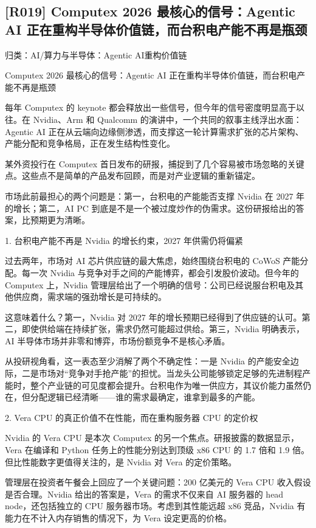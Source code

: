 \documentclass[11pt]{ctexart}
\begin{document}
\subsection{[R019] Computex 2026 最核心的信号：Agentic AI 正在重构半导体价值链，而台积电产能不再是瓶颈}
{\small\color{refgray}归类：AI/算力与半导体：Agentic AI重构价值链}

Computex 2026 最核心的信号：Agentic AI 正在重构半导体价值链，而台积电产能不再是瓶颈

每年 Computex 的 keynote 都会释放出一些信号，但今年的信号密度明显高于以往。在 Nvidia、Arm 和 Qualcomm 的演讲中，一个共同的叙事主线浮出水面：Agentic AI 正在从云端向边缘侧渗透，而支撑这一轮计算需求扩张的芯片架构、产能分配和竞争格局，正在发生结构性变化。

某外资投行在 Computex 首日发布的研报，捕捉到了几个容易被市场忽略的关键点。这些点不是简单的产品发布回顾，而是对产业逻辑的重新锚定。

市场此前最担心的两个问题是：第一，台积电的产能能否支撑 Nvidia 在 2027 年的增长；第二，AI PC 到底是不是一个被过度炒作的伪需求。这份研报给出的答案，比预期更为清晰。

1. 台积电产能不再是 Nvidia 的增长约束，2027 年供需仍将偏紧

过去两年，市场对 AI 芯片供应链的最大焦虑，始终围绕台积电的 CoWoS 产能分配。每一次 Nvidia 与竞争对手之间的产能博弈，都会引发股价波动。但今年的 Computex 上，Nvidia 管理层给出了一个明确的信号：公司已经说服台积电及其他供应商，需求端的强劲增长是可持续的。

这意味着什么？第一，Nvidia 对 2027 年的增长预期已经得到了供应链的认可。第二，即使供给端在持续扩张，需求仍然可能超过供给。第三，Nvidia 明确表示，AI 半导体市场并非零和博弈，市场份额竞争不是核心矛盾。

从投研视角看，这一表态至少消解了两个不确定性：一是 Nvidia 的产能安全边际，二是市场对“竞争对手抢产能”的担忧。当龙头公司能够锁定足够的先进制程产能时，整个产业链的可见度都会提升。台积电作为唯一供应方，其议价能力虽然仍在，但分配逻辑已经清晰——谁的需求最确定，谁拿到最多的产能。

2. Vera CPU 的真正价值不在性能，而在重构服务器 CPU 的定价权

Nvidia 的 Vera CPU 是本次 Computex 的另一个焦点。研报披露的数据显示，Vera 在编译和 Python 任务上的性能分别达到顶级 x86 CPU 的 1.7 倍和 1.9 倍。但比性能数字更值得关注的，是 Nvidia 对 Vera 的定价策略。

管理层在投资者午餐会上回应了一个关键问题：200 亿美元的 Vera CPU 收入假设是否合理。Nvidia 给出的答案是，Vera 的需求不仅来自 AI 服务器的 head node，还包括独立的 CPU 服务器市场。考虑到其性能远超 x86 竞品，Nvidia 有能力在不计入内存销售的情况下，为 Vera 设定更高的价格。
\end{document}

